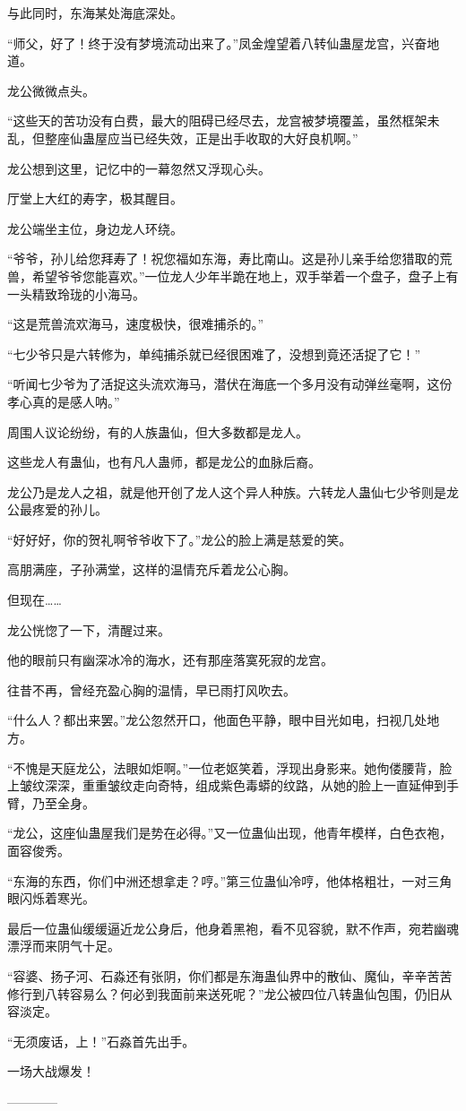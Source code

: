 \begin{this_body}
与此同时，东海某处海底深处。

“师父，好了！终于没有梦境流动出来了。”凤金煌望着八转仙蛊屋龙宫，兴奋地道。

龙公微微点头。

“这些天的苦功没有白费，最大的阻碍已经尽去，龙宫被梦境覆盖，虽然框架未乱，但整座仙蛊屋应当已经失效，正是出手收取的大好良机啊。”

龙公想到这里，记忆中的一幕忽然又浮现心头。

厅堂上大红的寿字，极其醒目。

龙公端坐主位，身边龙人环绕。

“爷爷，孙儿给您拜寿了！祝您福如东海，寿比南山。这是孙儿亲手给您猎取的荒兽，希望爷爷您能喜欢。”一位龙人少年半跪在地上，双手举着一个盘子，盘子上有一头精致玲珑的小海马。

“这是荒兽流欢海马，速度极快，很难捕杀的。”

“七少爷只是六转修为，单纯捕杀就已经很困难了，没想到竟还活捉了它！”

“听闻七少爷为了活捉这头流欢海马，潜伏在海底一个多月没有动弹丝毫啊，这份孝心真的是感人呐。”

周围人议论纷纷，有的人族蛊仙，但大多数都是龙人。

这些龙人有蛊仙，也有凡人蛊师，都是龙公的血脉后裔。

龙公乃是龙人之祖，就是他开创了龙人这个异人种族。六转龙人蛊仙七少爷则是龙公最疼爱的孙儿。

“好好好，你的贺礼啊爷爷收下了。”龙公的脸上满是慈爱的笑。

高朋满座，子孙满堂，这样的温情充斥着龙公心胸。

但现在……

龙公恍惚了一下，清醒过来。

他的眼前只有幽深冰冷的海水，还有那座落寞死寂的龙宫。

往昔不再，曾经充盈心胸的温情，早已雨打风吹去。

“什么人？都出来罢。”龙公忽然开口，他面色平静，眼中目光如电，扫视几处地方。

“不愧是天庭龙公，法眼如炬啊。”一位老妪笑着，浮现出身影来。她佝偻腰背，脸上皱纹深深，重重皱纹走向奇特，组成紫色毒蟒的纹路，从她的脸上一直延伸到手臂，乃至全身。

“龙公，这座仙蛊屋我们是势在必得。”又一位蛊仙出现，他青年模样，白色衣袍，面容俊秀。

“东海的东西，你们中洲还想拿走？哼。”第三位蛊仙冷哼，他体格粗壮，一对三角眼闪烁着寒光。

最后一位蛊仙缓缓逼近龙公身后，他身着黑袍，看不见容貌，默不作声，宛若幽魂漂浮而来阴气十足。

“容婆、扬子河、石淼还有张阴，你们都是东海蛊仙界中的散仙、魔仙，辛辛苦苦修行到八转容易么？何必到我面前来送死呢？”龙公被四位八转蛊仙包围，仍旧从容淡定。

“无须废话，上！”石淼首先出手。

一场大战爆发！

------------

\end{this_body}

